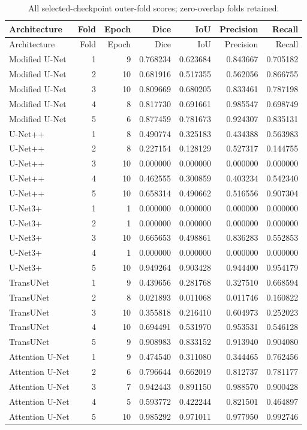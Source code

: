 \small
\begin{longtable}{lrrrrrr}
\caption{All selected-checkpoint outer-fold scores; zero-overlap folds retained.}\\
\toprule
Architecture & Fold & Epoch & Dice & IoU & Precision & Recall\\\midrule
\endfirsthead
\toprule
Architecture & Fold & Epoch & Dice & IoU & Precision & Recall\\\midrule
\endhead
Modified U-Net & 1 & 9 & 0.768234 & 0.623684 & 0.843667 & 0.705182\\
Modified U-Net & 2 & 10 & 0.681916 & 0.517355 & 0.562056 & 0.866755\\
Modified U-Net & 3 & 10 & 0.809669 & 0.680205 & 0.833461 & 0.787198\\
Modified U-Net & 4 & 8 & 0.817730 & 0.691661 & 0.985547 & 0.698749\\
Modified U-Net & 5 & 6 & 0.877459 & 0.781673 & 0.924307 & 0.835131\\
U-Net++ & 1 & 8 & 0.490774 & 0.325183 & 0.434388 & 0.563983\\
U-Net++ & 2 & 8 & 0.227154 & 0.128129 & 0.527317 & 0.144755\\
U-Net++ & 3 & 10 & 0.000000 & 0.000000 & 0.000000 & 0.000000\\
U-Net++ & 4 & 10 & 0.462555 & 0.300859 & 0.403234 & 0.542340\\
U-Net++ & 5 & 10 & 0.658314 & 0.490662 & 0.516556 & 0.907304\\
U-Net3+ & 1 & 1 & 0.000000 & 0.000000 & 0.000000 & 0.000000\\
U-Net3+ & 2 & 1 & 0.000000 & 0.000000 & 0.000000 & 0.000000\\
U-Net3+ & 3 & 10 & 0.665653 & 0.498861 & 0.836283 & 0.552853\\
U-Net3+ & 4 & 1 & 0.000000 & 0.000000 & 0.000000 & 0.000000\\
U-Net3+ & 5 & 10 & 0.949264 & 0.903428 & 0.944400 & 0.954179\\
TransUNet & 1 & 9 & 0.439656 & 0.281768 & 0.327510 & 0.668594\\
TransUNet & 2 & 8 & 0.021893 & 0.011068 & 0.011746 & 0.160822\\
TransUNet & 3 & 10 & 0.355818 & 0.216410 & 0.604973 & 0.252023\\
TransUNet & 4 & 10 & 0.694491 & 0.531970 & 0.953531 & 0.546128\\
TransUNet & 5 & 9 & 0.908983 & 0.833152 & 0.913940 & 0.904080\\
Attention U-Net & 1 & 9 & 0.474540 & 0.311080 & 0.344465 & 0.762456\\
Attention U-Net & 2 & 6 & 0.796644 & 0.662019 & 0.812737 & 0.781177\\
Attention U-Net & 3 & 7 & 0.942443 & 0.891150 & 0.988570 & 0.900428\\
Attention U-Net & 4 & 5 & 0.593772 & 0.422244 & 0.821501 & 0.464897\\
Attention U-Net & 5 & 10 & 0.985292 & 0.971011 & 0.977950 & 0.992746\\
\bottomrule\end{longtable}\normalsize
